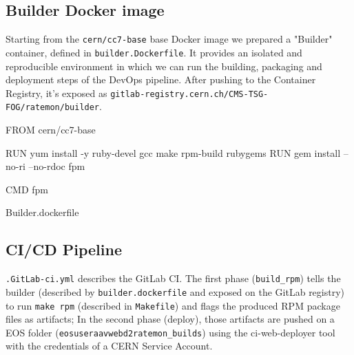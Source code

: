 \subsection{Builder Docker image}

Starting from the \texttt{cern/cc7-base} base Docker image we prepared a "Builder" container, defined in \texttt{builder.Dockerfile}. It provides an isolated and reproducible environment in which we can run the building, packaging and deployment steps of the DevOps pipeline.
After pushing to the Container Registry, it's exposed as \texttt{gitlab-registry.cern.ch/CMS-TSG-FOG/ratemon/builder}.

\begin{listing}[ht]
\begin{yamlcode}
FROM cern/cc7-base

RUN yum install -y ruby-devel gcc make rpm-build rubygems
RUN gem install --no-ri --no-rdoc fpm

CMD fpm
\end{yamlcode}
\caption{Builder.dockerfile}
\end{listing}


\subsection{CI/CD Pipeline}

\texttt{.GitLab-ci.yml} describes the GitLab CI. The first phase (\texttt{build\_rpm}) tells the builder (described by \texttt{builder.dockerfile} and exposed on the GitLab registry) to run \texttt{make rpm} (described in \texttt{Makefile}) and flags the produced RPM package files as artifacts; In the second phase (deploy), those artifacts are pushed on a EOS folder (\texttt{\/eos\/user\/a\/avwebd2\/ratemon\_builds}) using the ci-web-deployer tool with the credentials of a CERN Service Account.


